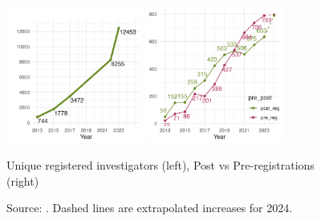 \begin{figure}
\centering
\includegraphics[width=0.4\textwidth]{data/registry/Output/registered_users_2023.png}
\includegraphics[width=0.4\textwidth]{data/registry/Output/post_pre_reg_2023.png}
\caption{Unique registered investigators (left), Post vs Pre-registrations (right)}
    \label{fig:registry2}
\caption*{\footnotesize Source: \citet{DVN/2RZF2X_2024}. Dashed lines are extrapolated increases for 2024.}
\end{figure}

